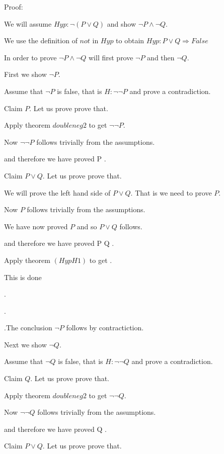 \documentclass[11pt, oneside]{article}
\begin{document}
 Proof: \begin{subproof}We will assume $Hyp : ¬ (P \lor Q) $ and show $¬ P \land ¬ Q $.\begin{subproof}We use the definition of $not$ in $ Hyp$ to obtain $Hyp : P \lor Q \Rightarrow False $ \begin{subproof}In order to prove $¬ P \land ¬ Q $ will first prove $¬ P $ and then $¬ Q $.

 First we show $¬ P $.\begin{subproof}Assume that $¬ P $ is false, that is $H : ¬ ¬ P $ and prove a contradiction.\begin{subproof}Claim $P $. Let us prove prove that. 

 \begin{subproof}Apply theorem $doubleneg2$ to get $¬ ¬ P $.\begin{subproof}Now $¬ ¬ P $ follows trivially from the assumptions.\end{subproof}\end{subproof} and therefore we have proved P .\begin{subproof}Claim $P \lor Q $. Let us prove prove that. 

 \begin{subproof}We will prove the left hand side of $P \lor Q $. That is we need to prove $P $.\begin{subproof}Now $P $ follows trivially from the assumptions.\end{subproof} We have now proved $P $ and so $P \lor Q $ follows.\end{subproof} and therefore we have proved P \lor Q .\begin{subproof}Apply theorem $(Hyp H1)$ to get $ $.\begin{subproof}This is done\end{subproof}\end{subproof}.\end{subproof}.\end{subproof}.The conclusion $¬ P $ follows by contractiction.\end{subproof} Next we show $¬ Q $.\begin{subproof}Assume that $¬ Q $ is false, that is $H : ¬ ¬ Q $ and prove a contradiction.\begin{subproof}Claim $Q $. Let us prove prove that. 

 \begin{subproof}Apply theorem $doubleneg2$ to get $¬ ¬ Q $.\begin{subproof}Now $¬ ¬ Q $ follows trivially from the assumptions.\end{subproof}\end{subproof} and therefore we have proved Q .\begin{subproof}Claim $P \lor Q $. Let us prove prove that. 


\end{subproof}
\end{subproof}
\end{subproof}
\end{subproof}
\end{subproof}
\end{subproof}
\end{document}

